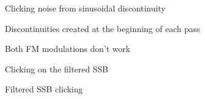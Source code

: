 
\begin{DoxyRefList}
\item[\label{bug__bug000001}%
\hypertarget{bug__bug000001}{}%
File \hyperlink{alsa__test_8cpp}{alsa\+\_\+test.cpp} ]Clicking noise from sinusoidal discontinuity  
\item[\label{bug__bug000002}%
\hypertarget{bug__bug000002}{}%
File \hyperlink{Filter_8hpp}{Filter.hpp} ]Discontinuities created at the beginning of each pass  
\item[\label{bug__bug000004}%
\hypertarget{bug__bug000004}{}%
File \hyperlink{Modulator_8hpp}{Modulator.hpp} ]Both F\+M modulations don't work 

Clicking on the filtered S\+S\+B  
\item[\label{bug__bug000005}%
\hypertarget{bug__bug000005}{}%
File \hyperlink{modulator__test_8cpp}{modulator\+\_\+test.cpp} ]Filtered S\+S\+B clicking 
\end{DoxyRefList}
